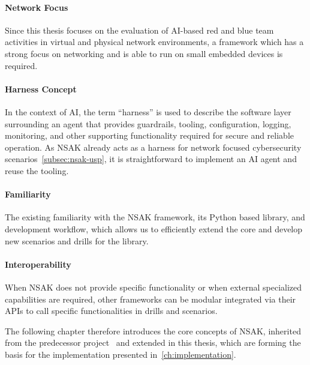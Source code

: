 \paragraph{Network Focus}
Since this thesis focuses on the evaluation of \gls{AI}-based red and blue team activities in virtual and physical network environments,
a framework which has a strong focus on networking and is able to run on small embedded devices is required.
\paragraph{Harness Concept}
In the context of \gls{AI}, the term \enquote{harness} is used to describe the software layer surrounding an agent that provides guardrails,
tooling, configuration, logging, monitoring, and other supporting functionality required for secure and reliable operation.
As \gls{NSAK} already acts as a harness for network focused cybersecurity scenarios~\ref{subsec:nsak-usp},
it is straightforward to implement an \gls{AI} agent and reuse the tooling.
\paragraph{Familiarity}
The existing familiarity with the \gls{NSAK} framework, its Python based library, and development workflow,
which allows us to efficiently extend the core and develop new scenarios and drills for the library.
\paragraph{Interoperability}
When \gls{NSAK} does not provide specific functionality or when external specialized capabilities are required, other frameworks can be modular integrated via their \glspl{API}
to call specific functionalities in drills and scenarios.

The following chapter therefore introduces the core concepts of \gls{NSAK}, inherited from the predecessor project~\cite{nsakRepository2026}
and extended in this thesis, which are forming the basis for the implementation presented in~\ref{ch:implementation}.
